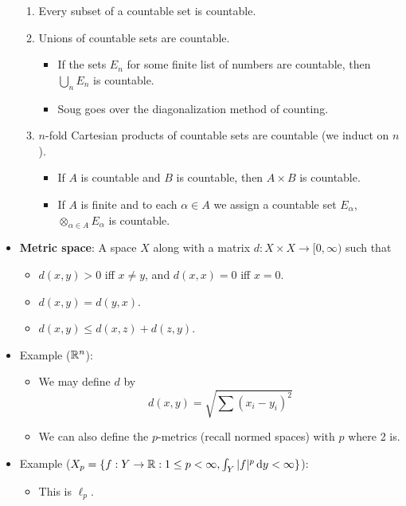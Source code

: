 \documentclass[../../notes.tex]{subfiles}
\begin{document}
\begin{itemize}
    \begin{enumerate}
        \item Every subset of a countable set is countable.
        \item Unions of countable sets are countable.
        \begin{itemize}
            \item If the sets $E_n$ for some finite list of numbers are countable, then $\bigcup_nE_n$ is countable.
            \item Soug goes over the diagonalization method of counting.
        \end{itemize}
        \item $n$-fold Cartesian products of countable sets are countable (we induct on $n$).
        \begin{itemize}
            \item If $A$ is countable and $B$ is countable, then $A\times B$ is countable.
            \item If $A$ is finite and to each $\alpha\in A$ we assign a countable set $E_\alpha$, $\otimes_{\alpha\in A}E_\alpha$ is countable.
        \end{itemize}
    \end{enumerate}
    \item \textbf{Metric space}: A space $X$ along with a matrix $d:X\times X\to[0,\infty)$ such that
    \begin{itemize}
        \item $d(x,y)>0$ iff $x\neq y$, and $d(x,x)=0$ iff $x=0$.
        \item $d(x,y)=d(y,x)$.
        \item $d(x,y)\leq d(x,z)+d(z,y)$.
    \end{itemize}
    \item Example ($\mathbb{R}^n$):
    \begin{itemize}
        \item We may define $d$ by
        \begin{equation*}
            d(x,y) = \sqrt{\sum(x_i-y_i)^2}
        \end{equation*}
        \item We can also define the $p$-metrics (recall normed spaces) with $p$ where 2 is.
    \end{itemize}
    \item Example ($X_p=\{f:Y\to\mathbb{R}:1\leq p<\infty,\int_Y|f|^p\dd{y}<\infty\}$):
    \begin{itemize}
        \item This is $\ell_p$.

\end{itemize}
\end{itemize}
\end{document}
